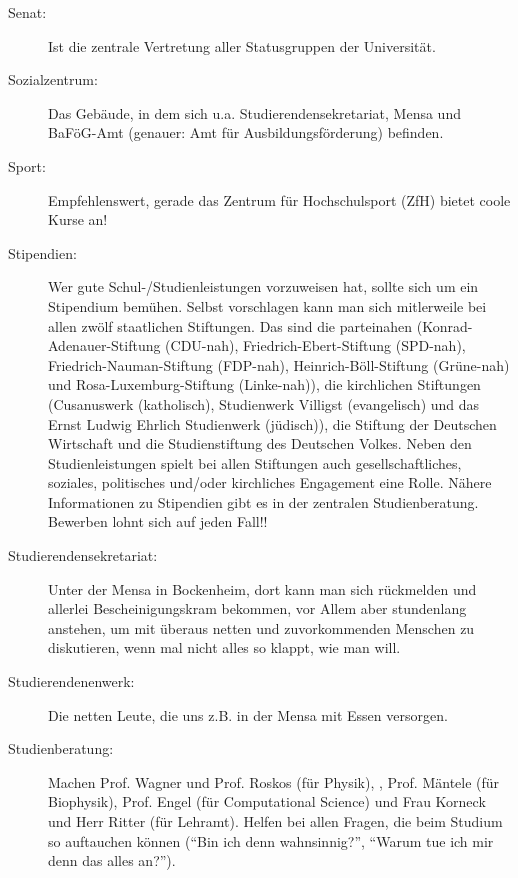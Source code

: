 \begin{description}
    \item[Senat:] Ist die zentrale Vertretung aller Statusgruppen der Universität.

    \item[Sozialzentrum:] Das Gebäude, in dem sich u.a. Studierendensekretariat, Mensa und
BaFöG-Amt (genauer: Amt für Ausbildungsförderung) befinden.

    \item[Sport:] Empfehlenswert, gerade das Zentrum für Hochschulsport (ZfH) bietet coole Kurse an!

    \item[Stipendien:] Wer gute Schul-/Studienleistungen vorzuweisen hat,
sollte sich um ein Stipendium bemühen.
Selbst vorschlagen kann man sich mitlerweile bei allen zwölf staatlichen Stiftungen.
Das sind die parteinahen (Konrad-Adenauer-Stiftung
(CDU-nah), Friedrich-Ebert-Stiftung (SPD-nah),
Friedrich-Nauman-Stiftung (FDP-nah), Heinrich-Böll-Stiftung
(Grüne-nah) und Rosa-Luxemburg-Stiftung (Linke-nah)),
die kirchlichen Stiftungen (Cusanuswerk (katholisch), Studienwerk Villigst (evangelisch)
und das Ernst Ludwig Ehrlich Studienwerk (jüdisch)),
die Stiftung der Deutschen Wirtschaft und die Studienstiftung des Deutschen Volkes.
Neben den Studienleistungen spielt bei allen Stiftungen auch
gesellschaftliches, soziales, politisches und/oder kirchliches
Engagement eine Rolle.
Nähere Informationen zu Stipendien gibt es in der zentralen Studienberatung.
Bewerben lohnt sich auf jeden Fall!!

    \item[Studierendensekretariat:] Unter der Mensa in Bockenheim,
dort kann man sich rückmelden und allerlei Bescheinigungskram
bekommen, vor Allem aber stundenlang anstehen, um mit überaus netten und zuvorkommenden
Menschen zu diskutieren, wenn mal nicht alles so klappt, wie man will.

    \item[Studierendenenwerk:] Die netten Leute, die uns z.B. in der Mensa
mit Essen versorgen.

    \item[Studienberatung:] Machen Prof. Wagner und Prof. Roskos (für Physik),
, Prof. Mäntele (für Biophysik),
    Prof. Engel (für Computational Science) und Frau Korneck und Herr Ritter
    (für Lehramt).
Helfen bei allen Fragen, die beim
Studium so auftauchen können (\enquote{Bin ich denn wahnsinnig?}, \enquote{Warum tue ich mir denn das alles an?}).


\end{description}
